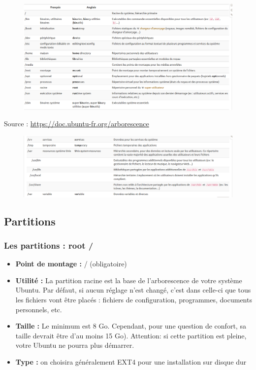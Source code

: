 	\begin{frame}
		\begin{figure}[!h]
			\centering
			\includegraphics[scale=0.4]{images/capture4}
		\end{figure}
		Source : \url{https://doc.ubuntu-fr.org/arborescence}
	\end{frame}
	
	\begin{frame}
		\begin{figure}[!h]
			\centering
			\includegraphics[scale=0.4]{images/capture5}
		\end{figure}
	\end{frame}

	\subsection{Partitions}
	\begin{frame}[containsverbatim]
		\frametitle{Les partitions  : root / }
		\begin{itemize}
			\item  \textbf{Point de montage :} / (obligatoire)
			\item \textbf{Utilité :} La partition racine est la base de l'arborescence de votre système Ubuntu. Par défaut, si aucun réglage n'est changé, c'est dans celle-ci que tous les fichiers vont être placés : fichiers de configuration, programmes, documents personnels, etc.
			\item\textbf{Taille :} Le minimum est 8 Go. Cependant, pour une question de confort, sa taille devrait être d'au moins 15 Go). Attention: si cette partition est pleine, votre Ubuntu ne pourra plus démarrer.
			\item \textbf{Type : }on choisira généralement EXT4 pour une installation sur disque dur
		\end{itemize}
	\end{frame}
	


